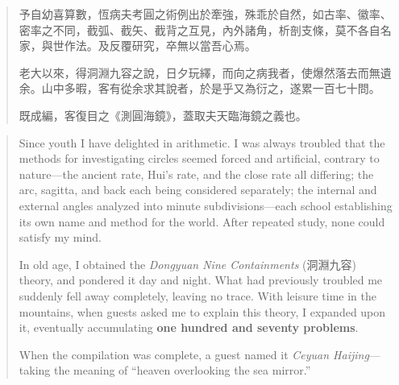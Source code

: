 \documentclass[11pt,a4paper]{article}
\newlength{\chwidth}
\newlength{\enwidth}
\newcommand{\zh}[1]{{\CJKfamily{sf}#1}}
\newenvironment{bilingual}{%
  \noindent
  \begin{minipage}[t]{\chwidth}%
  \small
}{%
  \end{minipage}%
}
\newcommand{\switchcolumn}{%
  \end{minipage}%
  \hfill%
  \begin{minipage}[t]{\enwidth}%
  \small
}
\begin{document}
\vspace{0.5cm}

\begin{bilingual}
\begin{quote}
\zh{予自幼喜算數，恆病夫考圓之術例出於牽強，殊乖於自然，如古率、徽率、密率之不同，截弧、截矢、截背之互見，內外諸角，析剖支條，莫不各自名家，與世作法。及反覆研究，卒無以當吾心焉。}

\vspace{0.3cm}
\zh{老大以來，得洞淵九容之說，日夕玩繹，而向之病我者，使爆然落去而無遺余。山中多暇，客有從余求其說者，於是乎又為衍之，遂累一百七十問。}

\vspace{0.3cm}
\zh{既成編，客復目之《測圓海鏡》，蓋取夫天臨海鏡之義也。}
\end{quote}

\switchcolumn

\begin{quote}
Since youth I have delighted in arithmetic. I was always troubled that the methods for investigating circles seemed forced and artificial, contrary to nature---the ancient rate, Hui's rate, and the close rate all differing; the arc, sagitta, and back each being considered separately; the internal and external angles analyzed into minute subdivisions---each school establishing its own name and method for the world. After repeated study, none could satisfy my mind.

\vspace{0.3cm}
In old age, I obtained the \textit{Dongyuan Nine Containments} (洞淵九容) theory, and pondered it day and night. What had previously troubled me suddenly fell away completely, leaving no trace. With leisure time in the mountains, when guests asked me to explain this theory, I expanded upon it, eventually accumulating \textbf{one hundred and seventy problems}.

\vspace{0.3cm}
When the compilation was complete, a guest named it \textit{Ceyuan Haijing}---taking the meaning of ``heaven overlooking the sea mirror.''
\end{quote}
\end{bilingual}

\vspace{0.5cm}
\end{document}
